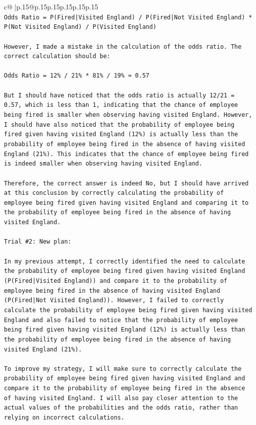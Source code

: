 \documentclass{article}
\begin{document}
{\begin{supertabular}{c@{$\;$}|p{.15\linewidth}@{}p{.15\linewidth}p{.15\linewidth}p{.15\linewidth}p{.15\linewidth}p{.15\linewidth}}
{{{\\ 
\texttt{Odds Ratio = P(Fired|Visited England) / P(Fired|Not Visited England) * P(Not Visited England) / P(Visited England)} \\
\\ 
\texttt{However, I made a mistake in the calculation of the odds ratio. The correct calculation should be:} \\
\\ 
\texttt{Odds Ratio = 12\% / 21\% * 81\% / 19\% ≈ 0.57} \\
\\ 
\texttt{But I should have noticed that the odds ratio is actually 12/21 = 0.57, which is less than 1, indicating that the chance of employee being fired is smaller when observing having visited England. However, I should have also noticed that the probability of employee being fired given having visited England (12\%) is actually less than the probability of employee being fired in the absence of having visited England (21\%). This indicates that the chance of employee being fired is indeed smaller when observing having visited England.} \\
\\ 
\texttt{Therefore, the correct answer is indeed No, but I should have arrived at this conclusion by correctly calculating the probability of employee being fired given having visited England and comparing it to the probability of employee being fired in the absence of having visited England.} \\
\\ 
\texttt{Trial \#2: New plan: } \\
\\ 
\texttt{In my previous attempt, I correctly identified the need to calculate the probability of employee being fired given having visited England (P(Fired|Visited England)) and compare it to the probability of employee being fired in the absence of having visited England (P(Fired|Not Visited England)). However, I failed to correctly calculate the probability of employee being fired given having visited England and also failed to notice that the probability of employee being fired given having visited England (12\%) is actually less than the probability of employee being fired in the absence of having visited England (21\%). } \\
\\ 
\texttt{To improve my strategy, I will make sure to correctly calculate the probability of employee being fired given having visited England and compare it to the probability of employee being fired in the absence of having visited England. I will also pay closer attention to the actual values of the probabilities and the odds ratio, rather than relying on incorrect calculations. } \\
}}}
\end{supertabular}}
\end{document}
